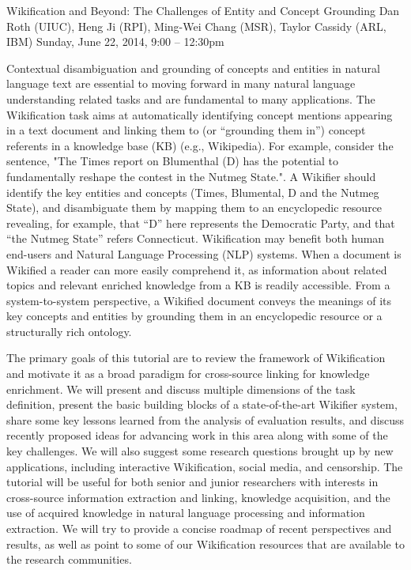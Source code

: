 \begin{tutorial}{Wikification and Beyond: The Challenges of Entity and Concept Grounding}
  {Dan Roth (UIUC), Heng Ji (RPI), Ming-Wei Chang (MSR), Taylor Cassidy (ARL, IBM)}
  {Sunday, June 22, 2014, 9:00 -- 12:30pm}
  {\TutLocD}

Contextual disambiguation and grounding of concepts and entities in natural language text are essential to moving forward in many natural language understanding related tasks and are fundamental to many applications. The Wikification task aims at automatically identifying concept mentions appearing in a text document and linking them to (or “grounding them in”) concept referents in a knowledge base (KB) (e.g., Wikipedia). For example, consider the sentence, "The Times report on Blumenthal (D) has the potential to fundamentally reshape the contest in the Nutmeg State.". A Wikifier should identify the key entities and concepts (Times, Blumental, D and the Nutmeg State), and disambiguate them by mapping them to an encyclopedic resource revealing, for example, that “D” here represents the Democratic Party, and that “the Nutmeg State” refers Connecticut. Wikification may benefit both human end-users and Natural Language Processing (NLP) systems. When a document is Wikified a reader can more easily comprehend it, as information about related topics and relevant enriched knowledge from a KB is readily accessible. From a system-to-system perspective, a Wikified document conveys the meanings of its key concepts and entities by grounding them in an encyclopedic resource or a structurally rich ontology.

The primary goals of this tutorial are to review the framework of Wikification and motivate it as a broad paradigm for cross-source linking for knowledge enrichment. We will present and discuss multiple dimensions of the task definition, present the basic building blocks of a state-of-the-art Wikifier system, share some key lessons learned from the analysis of evaluation results, and discuss recently proposed ideas for advancing work in this area along with some of the key challenges. We will also suggest some research questions brought up by new applications, including interactive Wikification, social media, and censorship. The tutorial will be useful for both senior and junior researchers with interests in cross-source information extraction and linking, knowledge acquisition, and the use of acquired knowledge in natural language processing and information extraction. We will try to provide a concise roadmap of recent perspectives and results, as well as point to some of our Wikification resources that are available to the research communities.

\end{tutorial}
